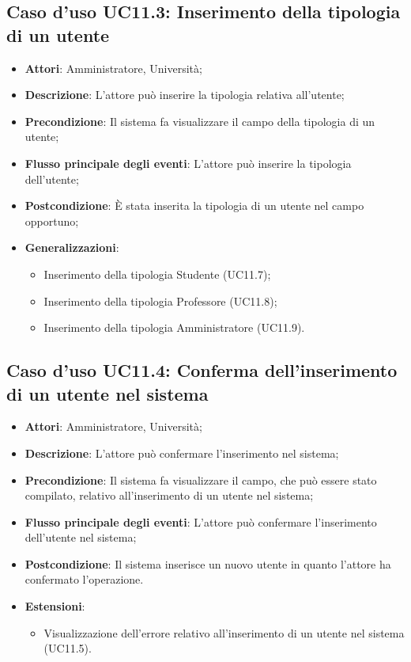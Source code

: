 \subsection{Caso d'uso \texorpdfstring{UC11.3}{UC11.3}: Inserimento della tipologia di un utente }
\begin{itemize}
	\item \textbf{Attori}: Amministratore, Università;
	\item \textbf{Descrizione}: L'attore può inserire la tipologia relativa all'utente;
	\item \textbf{Precondizione}: Il sistema fa visualizzare il campo della tipologia di un utente;
	
	\item \textbf{Flusso principale degli eventi}: L'attore può inserire la tipologia dell'utente;
	\item \textbf{Postcondizione}: È stata inserita la tipologia di un utente nel campo opportuno;
	\item \textbf{Generalizzazioni}:
	\begin{itemize}
		\item Inserimento della tipologia Studente (UC11.7); 
		\item Inserimento della tipologia Professore (UC11.8);
		\item Inserimento della tipologia Amministratore (UC11.9).
	\end{itemize}
	
\end{itemize}
\subsection{Caso d'uso \texorpdfstring{UC11.4}{UC11.4}: Conferma dell'inserimento di un utente nel sistema}
\begin{itemize}
	\item \textbf{Attori}: Amministratore, Università;
	\item \textbf{Descrizione}: L'attore può confermare l'inserimento nel sistema;
	\item \textbf{Precondizione}: Il sistema fa visualizzare il campo, che può essere stato compilato, relativo all'inserimento di un utente nel sistema;
	\item \textbf{Flusso principale degli eventi}: L'attore può confermare l'inserimento dell'utente nel sistema;
	\item \textbf{Postcondizione}: Il sistema inserisce un nuovo utente in quanto l'attore ha confermato l'operazione.
	
	\item \textbf{Estensioni}:
	\begin{itemize}
		\item Visualizzazione dell'errore relativo all'inserimento di un utente nel sistema (UC11.5).
	\end{itemize}
\end{itemize}
